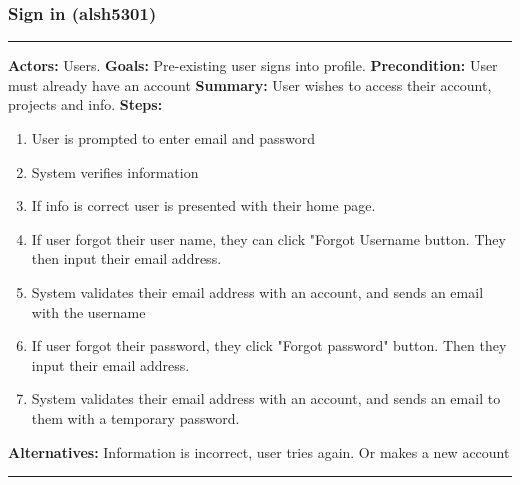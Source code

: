 \documentclass[11pt]{report}
\begin{document}
\subsubsection{Sign in (alsh5301)}
\vspace{2pt}
\hrule
\vspace{8pt}
 \textbf{Actors:} Users. \newline
\textbf{Goals:} Pre-existing user signs into profile. \newline
\textbf{Precondition:} User must already have an account \newline
\textbf{Summary:} User wishes to access their account, projects and info. \newline
\textbf{Steps:} \begin{enumerate}
  \item User is prompted to enter email and password
  \item System verifies information
  \item If info is correct user is presented with their home page.
  \item If user forgot their user name, they can click "Forgot Username button. They then input their email address.
  \item System validates their email address with an account, and sends an email with the username
  \item If user forgot their password, they click "Forgot password" button. Then they input their email address.
  \item System validates their email address with an account, and sends an email to them with a temporary password.
 \end{enumerate}
 \textbf{Alternatives:} Information is incorrect, user tries again. Or makes a new account \newline
\vspace{8pt}
\hrule
\newpage
\end{document}
